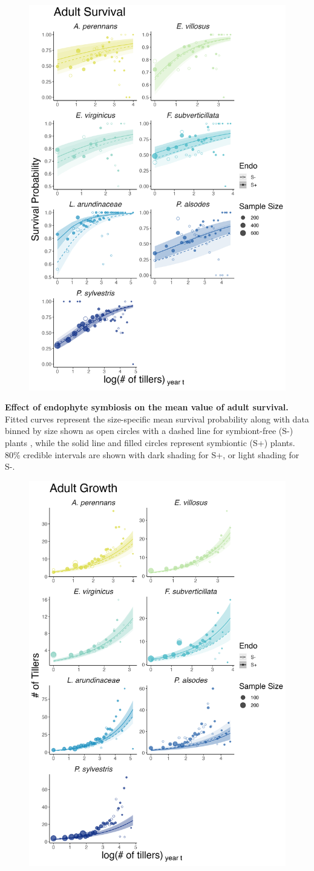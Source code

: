 \documentclass[12pt]{article}
\begin{document}
\begin{figure}[H]
	\centering
	\includegraphics[width=.6\linewidth]{surv_meanplot.png}
\end{figure}
 \textbf{Effect of endophyte symbiosis on the mean value of adult survival.} Fitted curves represent the size-specific mean survival probability along with data binned by size shown as open circles with a dashed line for symbiont-free (S-) plants , while the solid line and filled circles represent symbiontic (S+) plants. 80\% credible intervals are shown with dark shading for  S+, or light shading for S-.
\begin{figure}[H]
	\centering
	\includegraphics[width=.6\linewidth]{grow_meanplot.png}
\end{figure}
\end{document}
